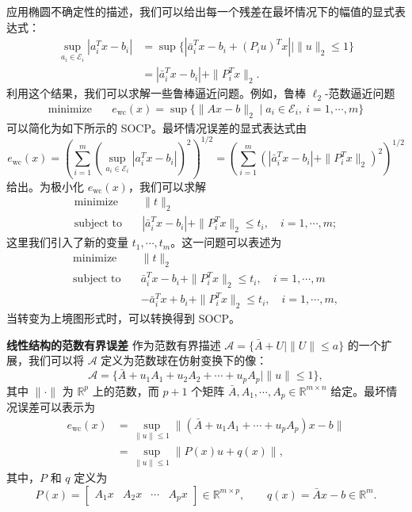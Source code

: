 \documentclass[UTF8,12pt,a4paper,fontset=fandol]{ctexart}
\begin{document}
应用椭圆不确定性的描述，我们可以给出每一个残差在最坏情况下的幅值的显式表达式：
\[
\begin{aligned}
\sup_{a_i\in\mathcal{E}_i}|a_i^Tx-b_i|
&=\sup\{|\bar{a}_i^Tx-b_i+(P_iu)^Tx|\mid \|u\|_2\leq 1\}\\
&=|\bar{a}_i^Tx-b_i|+\|P_i^Tx\|_2.
\end{aligned}
\]
利用这个结果，我们可以求解一些鲁棒逼近问题。例如，鲁棒 $\ell_2$-范数逼近问题
\[
\begin{aligned}
\text{minimize}\quad & e_{\mathrm{wc}}(x)=\sup\{\|Ax-b\|_2\mid a_i\in\mathcal{E}_i,\ i=1,\cdots,m\}
\end{aligned}
\]
可以简化为如下所示的 SOCP。最坏情况误差的显式表达式由
\[
e_{\mathrm{wc}}(x)=
\left(\sum_{i=1}^m\left(\sup_{a_i\in\mathcal{E}_i}|a_i^Tx-b_i|\right)^2\right)^{1/2}
=
\left(\sum_{i=1}^m\left(|\bar{a}_i^Tx-b_i|+\|P_i^Tx\|_2\right)^2\right)^{1/2}
\]
给出。为极小化 $e_{\mathrm{wc}}(x)$，我们可以求解
\[
\begin{aligned}
\text{minimize}\quad & \|t\|_2\\
\text{subject to}\quad & |\bar{a}_i^Tx-b_i|+\|P_i^Tx\|_2\leq t_i,\quad i=1,\cdots,m;
\end{aligned}
\]
这里我们引入了新的变量 $t_1,\cdots,t_m$。这一问题可以表述为
\[
\begin{aligned}
\text{minimize}\quad & \|t\|_2\\
\text{subject to}\quad & \bar{a}_i^Tx-b_i+\|P_i^Tx\|_2\leq t_i,\quad i=1,\cdots,m\\
& -\bar{a}_i^Tx+b_i+\|P_i^Tx\|_2\leq t_i,\quad i=1,\cdots,m,
\end{aligned}
\]
当转变为上境图形式时，可以转换得到 SOCP。

\noindent\textbf{线性结构的范数有界误差}\quad
作为范数有界描述 $\mathcal{A}=\{\bar{A}+U\mid \|U\|\leq a\}$ 的一个扩展，我们可以将 $\mathcal{A}$ 定义为范数球在仿射变换下的像：
\[
\mathcal{A}=\{\bar{A}+u_1A_1+u_2A_2+\cdots+u_pA_p\mid \|u\|\leq 1\},
\]
其中 $\|\cdot\|$ 为 $\mathbb{R}^p$ 上的范数，而 $p+1$ 个矩阵 $\bar{A},A_1,\cdots,A_p\in\mathbb{R}^{m\times n}$ 给定。最坏情况误差可以表示为
\[
\begin{aligned}
e_{\mathrm{wc}}(x)
&=\sup_{\|u\|\leq 1}\|(\bar{A}+u_1A_1+\cdots+u_pA_p)x-b\|\\
&=\sup_{\|u\|\leq 1}\|P(x)u+q(x)\|,
\end{aligned}
\]
其中，$P$ 和 $q$ 定义为
\[
P(x)=
\begin{bmatrix}
A_1x & A_2x & \cdots & A_px
\end{bmatrix}\in\mathbb{R}^{m\times p},
\qquad q(x)=\bar{A}x-b\in\mathbb{R}^m.
\]
\end{document}
